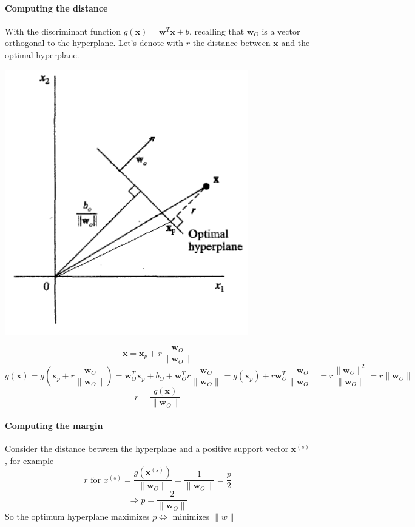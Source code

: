 \documentclass[10pt]{report}
\begin{document}
\paragraph{Computing the distance} With the discriminant function $g(\mathbf{x}) = \mathbf{w}^T\mathbf{x} + b$, recalling that $\mathbf{w}_O$ is a vector orthogonal to the hyperplane. Let's denote with $r$ the distance between $\mathbf{x}$ and the optimal hyperplane.
\begin{center}
	\includegraphics[scale=0.5]{20.png}
\end{center}
$$\mathbf{x}=\mathbf{x}_p+r\frac{\mathbf{w}_O}{\|\mathbf{w}_O\|}$$
$$g(\mathbf{x}) = g\left(\mathbf{x}_p + r\frac{\mathbf{w}_O}{\|\mathbf{w}_O\|}\right) = \mathbf{w}_O^T\mathbf{x}_p + b_O + \mathbf{w}_O^Tr\frac{\mathbf{w}_O}{\|\mathbf{w}_O\|} = g(\mathbf{x}_p) + r\mathbf{w}_O^T\frac{\mathbf{w}_O}{\|\mathbf{w}_O\|} = r\frac{\|\mathbf{w}_O\|^2}{\|\mathbf{w}_O\|} = r\|\mathbf{w}_O\|$$
$$r=\frac{g(\mathbf{x})}{\|\mathbf{w}_O\|}$$
\paragraph{Computing the margin} Consider the distance between the hyperplane and a positive support vector $\mathbf{x}^{(s)}$, for example $$r\text{ for }x^{(s)} = \frac{g(\mathbf{x}^{(s)})}{\|\mathbf{w}_O\|} = \frac{1}{\|\mathbf{w}_O\|} = \frac{p}{2}$$
$$\Rightarrow p = \frac{2}{\|\mathbf{w}_O\|}$$
So the optimum hyperplane maximizes $p\Leftrightarrow$ minimizes $\|w\|$
\end{document}
